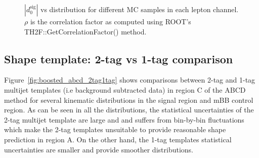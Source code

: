 \begin{figure}[!htbp]
\begin{center}
\caption{$|d_{0}^{\textrm{sig}}|$ vs \met distribution for different MC samples in each lepton channel. $\rho$ is the correlation factor
as computed using ROOT's TH2F::GetCorrelationFactor() method.}
\label{fig:boosted_qcd_d0met_mc}
\end{center}
\end{figure}


\FloatBarrier
%
%
\subsection{Shape template: 2-tag vs 1-tag comparison}
\label{app:boosted_qcd_2tag1tag}

Figure~\ref{fig:boosted_abcd_2tag1tag} shows comparisons between 2-tag and 1-tag multijet templates (i.e background subtracted data) 
in region C of the ABCD method for several kinematic distributions in the signal region and mBB control region. As can be seen in 
all the distributions, the statistical uncertainties of the 2-tag multijet template are large and and suffers from bin-by-bin fluctuations
which make the 2-tag templates unsuitable to provide reasonable shape prediction in region A. On the other hand, the 1-tag templates statistical
uncertainties are smaller and provide smoother distributions. 

